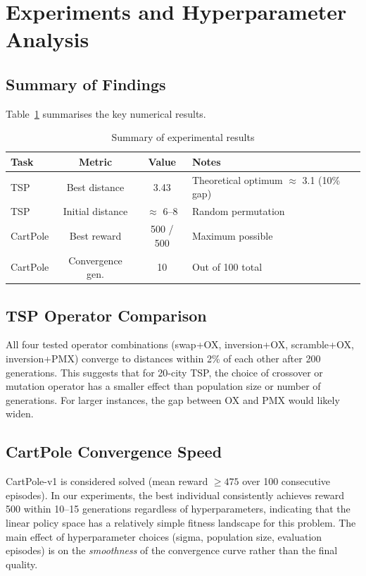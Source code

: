 \documentclass[12pt,a4paper]{article}
\begin{document}
\section{Experiments and Hyperparameter Analysis}
\label{sec:experiments}

\subsection{Summary of Findings}

Table~\ref{tab:results} summarises the key numerical results.

\begin{table}[H]
\centering
\caption{Summary of experimental results}
\label{tab:results}
\begin{tabular}{lccl}
\toprule
\textbf{Task} & \textbf{Metric} & \textbf{Value} & \textbf{Notes} \\
\midrule
TSP & Best distance & 3.43 & Theoretical optimum $\approx$ 3.1 (10\% gap) \\
TSP & Initial distance & $\approx$ 6--8 & Random permutation \\
CartPole & Best reward & 500 / 500 & Maximum possible \\
CartPole & Convergence gen. & 10 & Out of 100 total \\
\bottomrule
\end{tabular}
\end{table}

\subsection{TSP Operator Comparison}

All four tested operator combinations (swap+OX, inversion+OX, scramble+OX, inversion+PMX) converge to distances within 2\% of each other after 200 generations. This suggests that for 20-city TSP, the choice of crossover or mutation operator has a smaller effect than population size or number of generations. For larger instances, the gap between OX and PMX would likely widen.

\subsection{CartPole Convergence Speed}

CartPole-v1 is considered solved (mean reward $\geq 475$ over 100 consecutive episodes). In our experiments, the best individual consistently achieves reward 500 within 10--15 generations regardless of hyperparameters, indicating that the linear policy space has a relatively simple fitness landscape for this problem. The main effect of hyperparameter choices (sigma, population size, evaluation episodes) is on the \emph{smoothness} of the convergence curve rather than the final quality.
\end{document}
